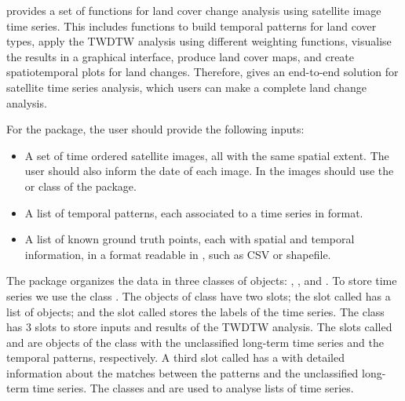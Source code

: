 \documentclass[article,shortnames]{jss}
\begin{document}
 provides a set of functions for land cover change analysis
using satellite image time series. This includes functions to build
temporal patterns for land cover types, apply the TWDTW analysis using
different weighting functions, visualise the results in a graphical
interface, produce land cover maps, and create spatiotemporal plots for
land changes. Therefore,  gives an end-to-end solution for
satellite time series analysis, which users can make a complete land
change analysis.

For the  package, the user should provide the following
inputs:

\begin{itemize}
\item
  A set of time ordered satellite images, all with the same spatial
  extent. The user should also inform the date of each image. In
   the images should use the  or
   class of the  package.
\item
  A list of temporal patterns, each associated to a time series in
   format.
\item
  A list of known ground truth points, each with spatial and temporal
  information, in a format readable in , such as CSV or
  shapefile.
\end{itemize}

The  package organizes the data in three  classes
of objects: , , and
. To store time series we use the class
. The objects of class  have
two slots; the slot called  has a list of 
objects; and the slot called  stores the labels of the time
series. The class  has 3 slots to store inputs and
results of the TWDTW analysis. The slots called  and
 are objects of the class  with the
unclassified long-term time series and the temporal patterns,
respectively. A third slot called  has a 
with detailed information about the matches between the patterns and the
unclassified long-term time series. The classes 
and  are used to analyse lists of time series.
\end{document}
